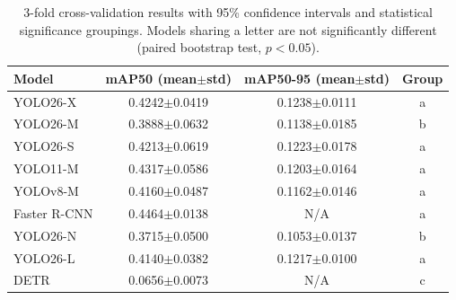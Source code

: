 \begin{table}[t]
\centering
\caption{3-fold cross-validation results with 95\% confidence intervals and statistical significance groupings. Models sharing a letter are not significantly different (paired bootstrap test, $p<0.05$).}
\label{tab:cv_results}
\small
\begin{tabular}{lccc}
\toprule
Model & mAP50 (mean$\pm$std) & mAP50-95 (mean$\pm$std) & Group \\
\midrule
YOLO26-X & 0.4242$\pm$0.0419 & 0.1238$\pm$0.0111 & a \\
YOLO26-M & 0.3888$\pm$0.0632 & 0.1138$\pm$0.0185 & b \\
YOLO26-S & 0.4213$\pm$0.0619 & 0.1223$\pm$0.0178 & a \\
YOLO11-M & 0.4317$\pm$0.0586 & 0.1203$\pm$0.0164 & a \\
YOLOv8-M & 0.4160$\pm$0.0487 & 0.1162$\pm$0.0146 & a \\
Faster R-CNN & 0.4464$\pm$0.0138 & N/A & a \\
YOLO26-N & 0.3715$\pm$0.0500 & 0.1053$\pm$0.0137 & b \\
YOLO26-L & 0.4140$\pm$0.0382 & 0.1217$\pm$0.0100 & a \\
DETR & 0.0656$\pm$0.0073 & N/A & c \\
\bottomrule
\end{tabular}
\end{table}
